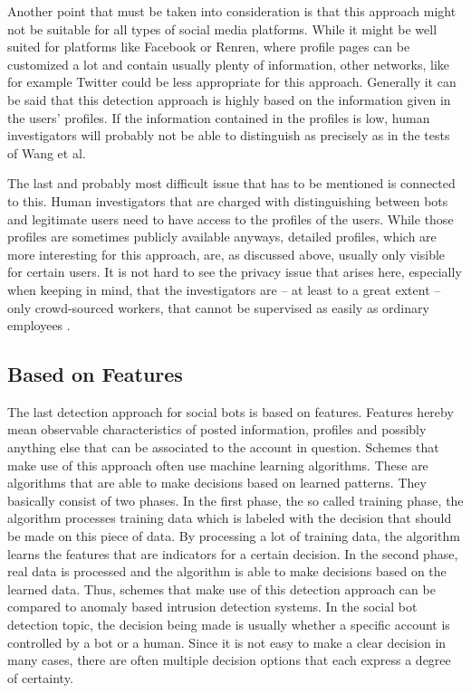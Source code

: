 Another point that must be taken into consideration is that this approach might not be suitable for all types of social media platforms. While it might be well suited for platforms like Facebook or Renren, where profile pages can be customized a lot and contain usually plenty of information, other networks, like for example Twitter could be less appropriate for this approach. Generally it can be said that this detection approach is highly based on the information given in the users' profiles. If the information contained in the profiles is low, human investigators will probably not be able to distinguish as precisely as in the tests of Wang et al.

The last and probably most difficult issue that has to be mentioned is connected to this. Human investigators that are charged with distinguishing between bots and legitimate users need to have access to the profiles of the users. While those profiles are sometimes publicly available anyways, detailed profiles, which are more interesting for this approach, are, as discussed above, usually only visible for certain users. It is not hard to see the privacy issue that arises here, especially when keeping in mind, that the investigators are -- at least to a great extent -- only crowd-sourced workers, that cannot be supervised as easily as ordinary employees \cite{ferrara15}.


\subsection{Based on Features}
The last detection approach for social bots is based on features. Features hereby mean observable characteristics of posted information, profiles and possibly anything else that can be associated to the account in question. Schemes that make use of this approach often use machine learning algorithms. These are algorithms that are able to make decisions based on learned patterns. They basically consist of two phases. In the first phase, the so called training phase, the algorithm processes training data which is labeled with the decision that should be made on this piece of data. By processing a lot of training data, the algorithm learns the features that are indicators for a certain decision. In the second phase, real data is processed and the algorithm is able to make decisions based on the learned data. Thus, schemes that make use of this detection approach can be compared to anomaly based intrusion detection systems. In the social bot detection topic, the decision being made is usually whether a specific account is controlled by a bot or a human. Since it is not easy to make a clear decision in many cases, there are often multiple decision options that each express a degree of certainty.

